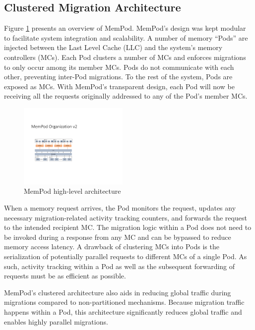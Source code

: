 \subsection{Clustered Migration Architecture}

 Figure \ref{fig:architecture_complete} presents an overview of MemPod. MemPod's design was kept modular to facilitate system integration and scalability. A number of memory ``Pods'' are injected between the Last Level Cache (LLC) and the system's memory controllers (MCs). Each Pod clusters a number of MCs and enforces migrations to only occur among its member MCs. Pods do not communicate with each other, preventing inter-Pod migrations. To the rest of the system, Pods are exposed as MCs. With MemPod's transparent design, each Pod will now be receiving all the requests originally addressed to any of the Pod's member MCs. 
 
\begin{figure}[h]
 \includegraphics[width=0.47\textwidth]{figures/mempod_org.pdf}
 \caption{MemPod high-level architecture}
 \label{fig:architecture_complete}
\end{figure}

When a memory request arrives, the Pod monitors the request, updates any 
necessary migration-related activity tracking counters, and forwards 
the request to the intended recipient MC. The migration logic within a Pod does not need to be invoked during a response from any MC and can be bypassed to reduce memory access latency. A drawback of clustering MCs into Pods is the serialization of potentially parallel requests to different MCs of a single Pod. As such, activity tracking within a Pod as well as the subsequent forwarding of requests must be as efficient as possible. 

MemPod's clustered architecture also aids in reducing global traffic during migrations compared to non-partitioned mechanisms.  Because migration
traffic happens within a Pod, this architecture significantly reduces global
traffic and enables highly parallel migrations.

